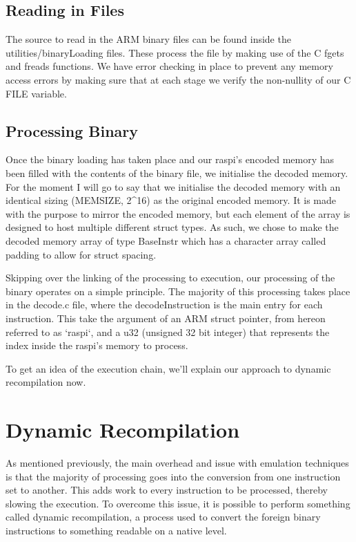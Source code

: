 \documentclass[11pt]{article}
\begin{document}
\subsection{Reading in Files}

The source to read in the ARM binary files can be found inside the utilities/binaryLoading files. These process the file by making use of the C fgets and freads functions. We have error checking in place to prevent any memory access errors by making sure that at each stage we verify the non-nullity of our C FILE variable.

\subsection{Processing Binary}

Once the binary loading has taken place and our raspi's encoded memory has been filled with the contents of the binary file, we initialise the decoded memory. For the moment I will go to say that we initialise the decoded memory with an identical sizing (MEMSIZE, 2^16) as the original encoded memory. It is made with the purpose to mirror the encoded memory, but each element of the array is designed to host multiple different struct types. As such, we chose to make the decoded memory array of type BaseInstr which has a character array called padding to allow for struct spacing.

Skipping over the linking of the processing to execution, our processing of the binary operates on a simple principle. The majority of this processing takes place in the decode.c file, where the decodeInstruction is the main entry for each instruction. This take the argument of an ARM struct pointer, from hereon referred to as `raspi`, and a u32 (unsigned 32 bit integer) that represents the index inside the raspi's memory to process.

To get an idea of the execution chain, we'll explain our approach to dynamic recompilation now.

\section{Dynamic Recompilation}

As mentioned previously, the main overhead and issue with emulation techniques is that the majority of processing goes into the conversion from one instruction set to another. This adds work to every instruction to be processed, thereby slowing the execution. To overcome this issue, it is possible to perform something called dynamic recompilation, a process used to convert the foreign binary instructions to something readable on a native level.
\end{document}
